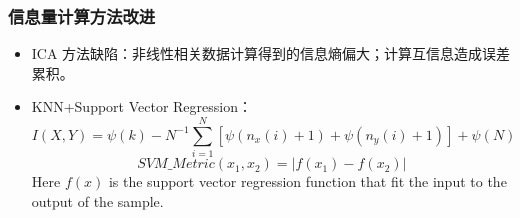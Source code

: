 \documentclass{beamer}
\begin{document}
\begin{CJK}{UTF8}{gkai}
\begin{frame}
\frametitle{信息量计算方法改进}
\begin{itemize}
\item ICA 方法缺陷：非线性相关数据计算得到的信息熵偏大；计算互信息造成误差累积。
\item KNN+Support Vector Regression：
\begin{equation*}
I(X,Y)=\psi(k)-N^{-1}\sum_{i=1}^{N}[\psi(n_x(i)+1)+\psi(n_y(i)+1)]+\psi(N)
\end{equation*}
\begin{equation}
SVM\_Metric(x_1,x_2)=|f(x_1)-f(x_2)|
\end{equation}
Here $f(x)$ is the support vector regression function that fit the input to the output of the sample.
\end{itemize}
\end{frame}


\end{CJK}
\end{document}
